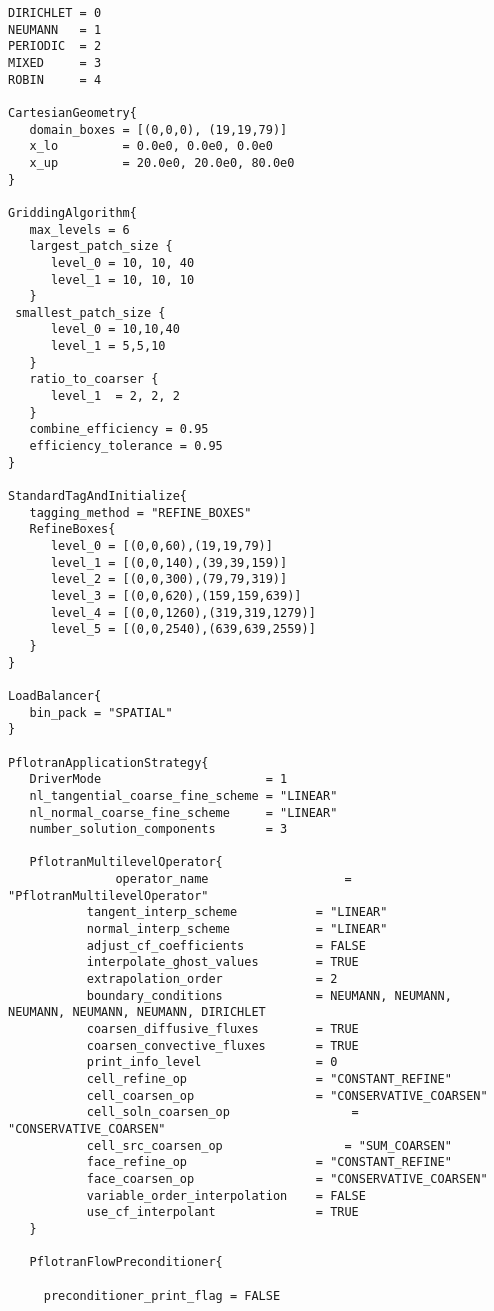 \documentclass[12pt]{article}
\begin{document}
\footnotesize
\begin{verbatim}
DIRICHLET = 0
NEUMANN   = 1
PERIODIC  = 2
MIXED     = 3
ROBIN     = 4

CartesianGeometry{
   domain_boxes = [(0,0,0), (19,19,79)]
   x_lo         = 0.0e0, 0.0e0, 0.0e0  
   x_up         = 20.0e0, 20.0e0, 80.0e0
}

GriddingAlgorithm{
   max_levels = 6 
   largest_patch_size {
      level_0 = 10, 10, 40
      level_1 = 10, 10, 10
   }
 smallest_patch_size {
      level_0 = 10,10,40
      level_1 = 5,5,10
   }
   ratio_to_coarser {
      level_1  = 2, 2, 2
   }
   combine_efficiency = 0.95
   efficiency_tolerance = 0.95
}

StandardTagAndInitialize{
   tagging_method = "REFINE_BOXES"
   RefineBoxes{
      level_0 = [(0,0,60),(19,19,79)]
      level_1 = [(0,0,140),(39,39,159)]
      level_2 = [(0,0,300),(79,79,319)]
      level_3 = [(0,0,620),(159,159,639)]
      level_4 = [(0,0,1260),(319,319,1279)]
      level_5 = [(0,0,2540),(639,639,2559)]
   }
}

LoadBalancer{
   bin_pack = "SPATIAL"
}

PflotranApplicationStrategy{
   DriverMode                       = 1
   nl_tangential_coarse_fine_scheme = "LINEAR"
   nl_normal_coarse_fine_scheme     = "LINEAR"
   number_solution_components       = 3

   PflotranMultilevelOperator{
     	       operator_name                   = "PflotranMultilevelOperator"
	       tangent_interp_scheme           = "LINEAR"
	       normal_interp_scheme            = "LINEAR"
	       adjust_cf_coefficients          = FALSE
	       interpolate_ghost_values        = TRUE
	       extrapolation_order             = 2
	       boundary_conditions             = NEUMANN, NEUMANN, NEUMANN, NEUMANN, NEUMANN, DIRICHLET
	       coarsen_diffusive_fluxes        = TRUE
	       coarsen_convective_fluxes       = TRUE
	       print_info_level                = 0
	       cell_refine_op                  = "CONSTANT_REFINE"
	       cell_coarsen_op                 = "CONSERVATIVE_COARSEN"
	       cell_soln_coarsen_op                 = "CONSERVATIVE_COARSEN"
	       cell_src_coarsen_op                 = "SUM_COARSEN"
	       face_refine_op                  = "CONSTANT_REFINE"
	       face_coarsen_op                 = "CONSERVATIVE_COARSEN"
	       variable_order_interpolation    = FALSE
	       use_cf_interpolant              = TRUE
   }

   PflotranFlowPreconditioner{

     preconditioner_print_flag = FALSE


\end{verbatim}
\end{document}
